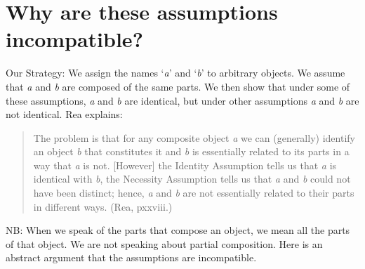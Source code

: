\documentclass[9pt]{article}
\begin{document}
\section{Why are these assumptions incompatible?} 

Our Strategy: We assign the names `\emph{a}' and `\emph{b}' to arbitrary objects. We assume  that \emph{a} and \emph{b} are composed of the same parts. We then show that under some of these assumptions, \emph{a} and \emph{b} are identical, but under other assumptions \emph{a} and  \emph{b} are not identical. Rea explains: 
\begin{quote}The problem is that for any composite object \emph{a} we can (generally) identify an object \emph{b} that constitutes it and \emph{b} is essentially related to its parts in a way that \emph{a} is not. [However] the  Identity Assumption tells us that \emph{a} is identical with \emph{b}, the Necessity Assumption tells us that \emph{a} and \emph{b} could not have been distinct; hence, \emph{a} and \emph{b} are not essentially related to their parts in different ways. (Rea, pxxviii.) 
\end{quote}
NB: When we speak of the parts that compose an object, we mean all the parts of  that object. We are not speaking about partial composition. Here is an abstract argument that the assumptions are incompatible. 
\end{document}
